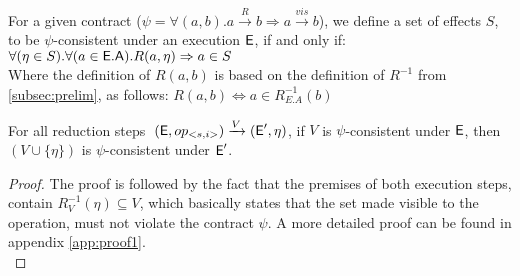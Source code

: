 %
%
\begin{definition}
For a given contract ($\psi=\forall(a,b). a
\xrightarrow{R} b \Rightarrow a \xrightarrow{vis} b $), we define a set
of effects $S$, to be  $\psi$-consistent under an execution ${\normalfont \textsf{E}}$, if and
only if: 
$\forall (\eta \in S). \forall(a\in {\normalfont \textsf{E}}.{\normalfont \textsf{A}}). R(a,\eta)
\Rightarrow a \in S$ 
\\Where the definition of $R(a,b)$ is based on the definition of $R^{-1}$ from
\ref{subsec:prelim}, as follows: $R(a,b) \iff a \in R_{E.A}^{-1}(b)  $
\end{definition}

\begin{theorem}
\label{theorem:one}
For all reduction steps 
$
\; ({\normalfont \textsf{E}},op_{<s,i>}) 
    \xrightarrow{V}
  ({\normalfont \textsf{E}}',\eta)  
$,
if $V$ is $\psi$-consistent under ${\normalfont \textsf{E}}$, then $(V\cup\{\eta\})$ is
$\psi$-consistent under ${\normalfont \textsf{E}}'$.
\end{theorem}
\begin{proof}
The proof is followed by the fact that the premises of both execution
steps, contain $R_V^{-1}(\eta)\subseteq V$, which basically states that the set made visible to
the operation, must not violate the contract $\psi$. A more detailed proof can
be found in appendix \ref{app:proof1}.
\\
\end{proof}





